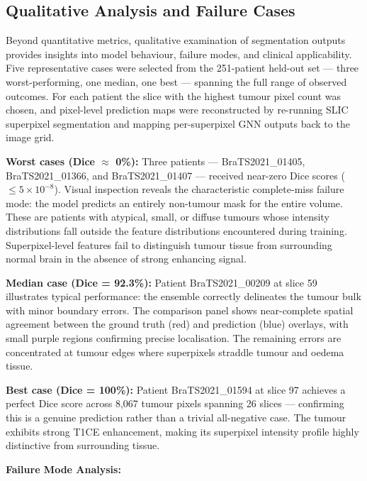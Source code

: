 \subsection{Qualitative Analysis and Failure Cases}

Beyond quantitative metrics, qualitative examination of segmentation outputs provides insights into model behaviour, failure modes, and clinical applicability. Five representative cases were selected from the 251-patient held-out set — three worst-performing, one median, one best — spanning the full range of observed outcomes. For each patient the slice with the highest tumour pixel count was chosen, and pixel-level prediction maps were reconstructed by re-running SLIC superpixel segmentation and mapping per-superpixel GNN outputs back to the image grid.

\textbf{Worst cases (Dice $\approx$ 0\%):}
Three patients — BraTS2021\_01405, BraTS2021\_01366, and BraTS2021\_01407 — received near-zero Dice scores ($\leq 5 \times 10^{-8}$). Visual inspection reveals the characteristic complete-miss failure mode: the model predicts an entirely non-tumour mask for the entire volume. These are patients with atypical, small, or diffuse tumours whose intensity distributions fall outside the feature distributions encountered during training. Superpixel-level features fail to distinguish tumour tissue from surrounding normal brain in the absence of strong enhancing signal.

\textbf{Median case (Dice = 92.3\%):}
Patient BraTS2021\_00209 at slice 59 illustrates typical performance: the ensemble correctly delineates the tumour bulk with minor boundary errors. The comparison panel shows near-complete spatial agreement between the ground truth (red) and prediction (blue) overlays, with small purple regions confirming precise localisation. The remaining errors are concentrated at tumour edges where superpixels straddle tumour and oedema tissue.

\textbf{Best case (Dice = 100\%):}
Patient BraTS2021\_01594 at slice 97 achieves a perfect Dice score across 8,067 tumour pixels spanning 26 slices — confirming this is a genuine prediction rather than a trivial all-negative case. The tumour exhibits strong T1CE enhancement, making its superpixel intensity profile highly distinctive from surrounding tissue.

\textbf{Failure Mode Analysis:}

